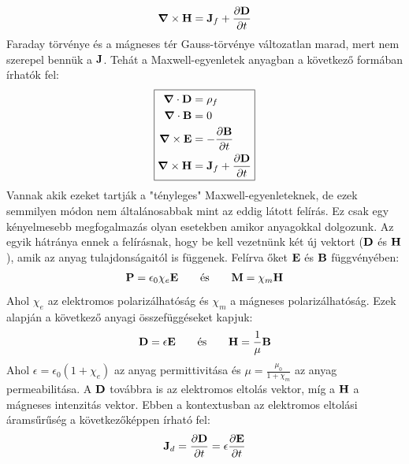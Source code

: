 \documentclass[a4paper,12pt]{article}
\begin{document}
\begin{equation}
    \boldsymbol{\nabla} \times \bold{H} = \bold{J}_f + \frac{\partial \bold{D}}{\partial t}
\end{equation}
Faraday törvénye és a mágneses tér Gauss-törvénye változatlan marad, mert nem szerepel bennük a $\bold{J}$. Tehát a Maxwell-egyenletek anyagban a következő formában írhatók fel:
\begin{equation}
    \boxed{\begin{aligned}
        \boldsymbol{\nabla} \cdot \bold{D} &= \rho_f \\
        \boldsymbol{\nabla} \cdot \bold{B} &= 0 \\
        \boldsymbol{\nabla} \times \bold{E} &= - \frac{\partial \bold{B}}{\partial t} \\
        \boldsymbol{\nabla} \times \bold{H} &= \bold{J}_f + \frac{\partial \bold{D}}{\partial t}
    \end{aligned}}
\end{equation}
Vannak akik ezeket tartják a "tényleges" Maxwell-egyenleteknek, de ezek semmilyen módon nem általánosabbak mint az eddig látott felírás. Ez csak egy kényelmesebb megfogalmazás olyan esetekben amikor anyagokkal dolgozunk.
Az egyik hátránya ennek a felírásnak, hogy be kell vezetnünk két új vektort ($\bold{D}$ és $\bold{H}$), amik az anyag tulajdonságaitól is függenek. Felírva őket $\bold{E}$ és $\bold{B}$ függvényében:
\begin{equation}
    \bold{P} = \epsilon_0 \chi_e \bold{E} \qquad \text{és} \qquad \bold{M} = \chi_m \bold{H}
\end{equation}
Ahol $\chi_e$ az elektromos polarizálhatóság és $\chi_m$ a mágneses polarizálhatóság. Ezek alapján a következő anyagi összefüggéseket kapjuk:
\begin{equation}
    \bold{D} = \epsilon \bold{E} \qquad \text{és} \qquad \bold{H} = \frac{1}{\mu} \bold{B}
\end{equation}
Ahol $\epsilon = \epsilon_0 (1 + \chi_e)$ az anyag permittivitása és $\mu = \frac{\mu_0}{1 + \chi_m}$ az anyag permeabilitása. A $\bold{D}$ továbbra is az elektromos eltolás vektor, míg a $\bold{H}$ a mágneses intenzitás vektor.
Ebben a kontextusban az elektromos eltolási áramsűrűség a következőképpen írható fel:
\begin{equation}
    \bold{J}_d = \frac{\partial \bold{D}}{\partial t} = \epsilon \frac{\partial \bold{E}}{\partial t}
\end{equation}
\end{document}
